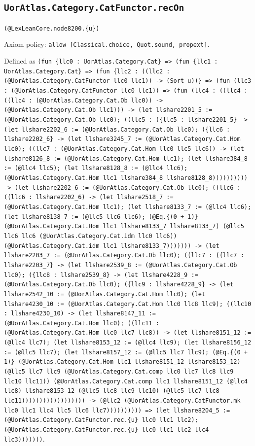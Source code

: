 \documentclass[11pt]{article}
\begin{document}
\subsection*{\texttt{UorAtlas.Category.CatFunctor.recOn}}
\noindent\texttt{(@LexLeanCore.node8200.\{u\})}\par
\noindent Axiom policy: \texttt{allow [Classical.choice, Quot.sound, propext]}.\par
\noindent Defined as \texttt{(fun \{llc0 : UorAtlas.Category.Cat\} => (fun \{llc1 : UorAtlas.Category.Cat\} => (fun \{llc2 : ((llc2 : (@UorAtlas.Category.CatFunctor llc0 llc1)) -> (Sort u))\} => (fun (llc3 : (@UorAtlas.Category.CatFunctor llc0 llc1)) => (fun (llc4 : ((llc4 : ((llc4 : (@UorAtlas.Category.Cat.Ob llc0)) -> (@UorAtlas.Category.Cat.Ob llc1))) -> (let llshare2201\_5 := (@UorAtlas.Category.Cat.Ob llc0); ((llc5 : (\{llc5 : llshare2201\_5\} -> (let llshare2202\_6 := (@UorAtlas.Category.Cat.Ob llc0); (\{llc6 : llshare2202\_6\} -> (let llshare3245\_7 := (@UorAtlas.Category.Cat.Hom llc0); ((llc7 : (@UorAtlas.Category.Cat.Hom llc0 llc5 llc6)) -> (let llshare8126\_8 := (@UorAtlas.Category.Cat.Hom llc1); (let llshare384\_8 := (@llc4 llc5); (let llshare8128\_8 := (@llc4 llc6); (@UorAtlas.Category.Cat.Hom llc1 llshare384\_8 llshare8128\_8)))))))))) -> (let llshare2202\_6 := (@UorAtlas.Category.Cat.Ob llc0); ((llc6 : ((llc6 : llshare2202\_6) -> (let llshare2518\_7 := (@UorAtlas.Category.Cat.Hom llc1); (let llshare8133\_7 := (@llc4 llc6); (let llshare8138\_7 := (@llc5 llc6 llc6); (@Eq.\{(0 + 1)\} (@UorAtlas.Category.Cat.Hom llc1 llshare8133\_7 llshare8133\_7) (@llc5 llc6 llc6 (@UorAtlas.Category.Cat.idm llc0 llc6)) (@UorAtlas.Category.Cat.idm llc1 llshare8133\_7))))))) -> (let llshare2203\_7 := (@UorAtlas.Category.Cat.Ob llc0); ((llc7 : (\{llc7 : llshare2203\_7\} -> (let llshare2539\_8 := (@UorAtlas.Category.Cat.Ob llc0); (\{llc8 : llshare2539\_8\} -> (let llshare4228\_9 := (@UorAtlas.Category.Cat.Ob llc0); (\{llc9 : llshare4228\_9\} -> (let llshare2542\_10 := (@UorAtlas.Category.Cat.Hom llc0); (let llshare4230\_10 := (@UorAtlas.Category.Cat.Hom llc0 llc8 llc9); ((llc10 : llshare4230\_10) -> (let llshare8147\_11 := (@UorAtlas.Category.Cat.Hom llc0); ((llc11 : (@UorAtlas.Category.Cat.Hom llc0 llc7 llc8)) -> (let llshare8151\_12 := (@llc4 llc7); (let llshare8153\_12 := (@llc4 llc9); (let llshare8156\_12 := (@llc5 llc7); (let llshare8157\_12 := (@llc5 llc7 llc9); (@Eq.\{(0 + 1)\} (@UorAtlas.Category.Cat.Hom llc1 llshare8151\_12 llshare8153\_12) (@llc5 llc7 llc9 (@UorAtlas.Category.Cat.comp llc0 llc7 llc8 llc9 llc10 llc11)) (@UorAtlas.Category.Cat.comp llc1 llshare8151\_12 (@llc4 llc8) llshare8153\_12 (@llc5 llc8 llc9 llc10) (@llc5 llc7 llc8 llc11)))))))))))))))))) -> (@llc2 (@UorAtlas.Category.CatFunctor.mk llc0 llc1 llc4 llc5 llc6 llc7)))))))))) => (let llshare8204\_5 := (@UorAtlas.Category.CatFunctor.rec.\{u\} llc0 llc1 llc2); (@UorAtlas.Category.CatFunctor.rec.\{u\} llc0 llc1 llc2 llc4 llc3)))))))}.\par
\end{document}
